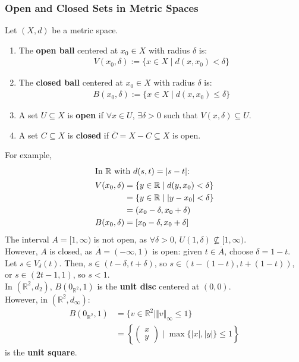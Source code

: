 \documentclass[10pt]{extarticle}
\newcommand{\R}{\mathbb{R}}
\begin{document}
    \subsubsection{Open and Closed Sets in Metric Spaces}%
    Let $(X,d)$ be a metric space.
    \begin{enumerate}[(1)]
      \item The \textbf{open ball} centered at $x_0\in X$ with radius $\delta$ is:
        \begin{align*}
        V(x_0,\delta) := \{x\in X \mid d(x,x_0) < \delta\}
        \end{align*}
      \item The \textbf{closed ball} centered at $x_0\in X$  with radius $\delta$ is:
        \begin{align*}
          B(x_0,\delta) := \{x\in X \mid d(x,x_0) \leq \delta\}
        \end{align*}
      \item A set $U\subseteq X$ is \textbf{open} if $\forall x\in U$, $\exists \delta > 0$ such that $V(x,\delta)\subseteq U$.
      \item A set $C\subseteq X$ is \textbf{closed} if $\overline{C} = X-C\subseteq X$ is open.
    \end{enumerate}
    For example, 
      \begin{align*}
        \shortintertext{In $\R$ with $d(s,t) = |s-t|$:}
        V(x_0,\delta) &= \{y\in\R \mid d(y,x_0) < \delta\}\\
                      &= \{y\in\R \mid |y-x_0| < \delta\}\\
                      &= (x_0-\delta,x_0+\delta)\\
        B(x_0,\delta) &= [x_0-\delta,x_0+\delta]
      \end{align*}
      The interval $A = [1,\infty)$ is not open, as $\forall \delta > 0$, $U(1,\delta)\not\subseteq [1,\infty)$.\\

      However, $A$ is closed, as $\overline{A} = (-\infty,1)$ is open: given $t\in \overline{A}$, choose $\delta = 1-t$. Let $s\in V_{\delta}(t)$. Then, $s\in (t-\delta, t+\delta)$, so $s\in (t-(1-t),t + (1-t))$, or $s\in(2t-1,1)$, so $s < 1$.\\

    In $(\R^2,d_2)$, $B(0_{\R^2},1)$ is the \textbf{unit disc} centered at $(0,0)$.\\

    However, in $(\R^2,d_{\infty})$:
    \begin{align*}
      B(0_{\R^2},1) &= \{v\in\R^2 \mid \Vert v \Vert_{\infty} \leq 1\}\\
                    &= \left\{\begin{pmatrix}x\\y\end{pmatrix}\mid \max\{|x|,|y|\}\leq 1\right\}
    \end{align*}
    is the \textbf{unit square}.
\end{document}
